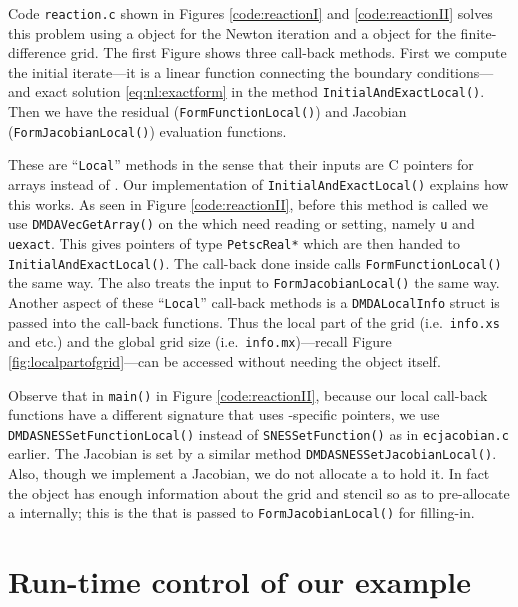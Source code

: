 
Code \texttt{reaction.c} shown in Figures \eqref{code:reactionI} and \eqref{code:reactionII} solves this problem using a \pSNES object for the Newton iteration and a \pDMDA object for the finite-difference grid.  The first Figure shows three call-back methods.  First we compute the initial iterate---it is a linear function connecting the boundary conditions---and exact solution  \eqref{eq:nl:exactform} in the method \texttt{InitialAndExactLocal()}.  Then we have the residual (\texttt{FormFunctionLocal()}) and Jacobian (\texttt{FormJacobianLocal()}) evaluation functions.

These are ``\texttt{Local}'' methods in the sense that their inputs are C pointers for arrays instead of \pVecs.  Our implementation of \texttt{InitialAndExactLocal()} explains how this works.  As seen in Figure \ref{code:reactionII}, before this method is called we use \texttt{DMDAVecGetArray()} on the \pVecs which need reading or setting, namely \texttt{u} and \texttt{uexact}.  This gives pointers of type \texttt{PetscReal*} which are then handed to \texttt{InitialAndExactLocal()}.  The call-back done inside \pSNES calls \texttt{FormFunctionLocal()} the same way.  The \pSNES also treats the input to  \texttt{FormJacobianLocal()} the same way.  Another aspect of these ``\texttt{Local}'' call-back methods is a \texttt{DMDALocalInfo} struct is passed into the call-back functions.  Thus the local part of the grid (i.e.~\texttt{info.xs} and etc.) and the global grid size (i.e.~\texttt{info.mx})---recall Figure \ref{fig:localpartofgrid}---can be accessed without needing the \pDMDA object itself.

Observe that in \texttt{main()} in Figure \ref{code:reactionII}, because our local call-back functions have a different signature that uses \pDMDA-specific pointers, we use \texttt{DMDASNESSetFunctionLocal()} instead of \texttt{SNESSetFunction()} as in \texttt{ecjacobian.c} earlier.  The Jacobian is set by a similar method \texttt{DMDASNESSetJacobianLocal()}.  Also, though we implement a Jacobian, we do not allocate a \pMat to hold it.  In fact the \pDMDA object has enough information about the grid and stencil so as to pre-allocate a \pMat internally; this is the \pMat that is passed to \texttt{FormJacobianLocal()} for filling-in.


\section{Run-time control of our example}

